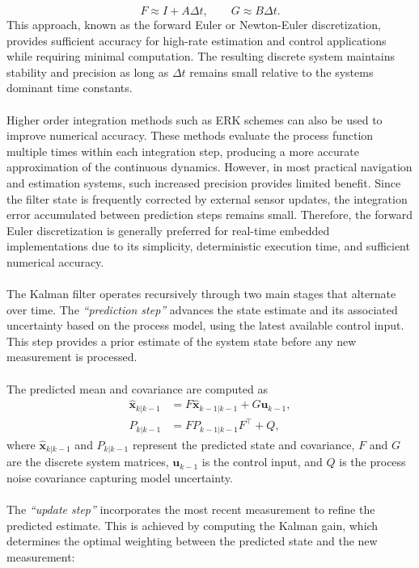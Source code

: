 $$
    F \approx I + A\Delta t, \qquad
    G \approx B\Delta t.
$$
This approach, known as the forward Euler or Newton-Euler discretization, provides sufficient accuracy for high-rate estimation and control applications while requiring minimal computation. The resulting discrete system maintains stability and precision as long as $\Delta t$ remains small relative to the systems dominant time constants.  
\\ \\
Higher order integration methods such as ERK schemes can also be used to improve numerical accuracy. These methods evaluate the process function multiple times within each integration step, producing a more accurate approximation of the continuous dynamics. However, in most practical navigation and estimation systems, such increased precision provides limited benefit. Since the filter state is frequently corrected by external sensor updates, the integration error accumulated between prediction steps remains small. Therefore, the forward Euler discretization is generally preferred for real-time embedded implementations due to its simplicity, deterministic execution time, and sufficient numerical accuracy.  
\\ \\
The Kalman filter operates recursively through two main stages that alternate over time. The \textit{``prediction step''} advances the state estimate and its associated uncertainty based on the process model, using the latest available control input. This step provides a prior estimate of the system state before any new measurement is processed.  
\\ \\
The predicted mean and covariance are computed as
$$
\begin{aligned}
    \hat{\mathbf{x}}_{k|k-1} &= F\hat{\mathbf{x}}_{k-1|k-1} + G\mathbf{u}_{k-1}, \\
    P_{k|k-1} &= FP_{k-1|k-1}F^\top + Q,
\end{aligned}
$$
where $\hat{\mathbf{x}}_{k|k-1}$ and $P_{k|k-1}$ represent the predicted state and covariance, $F$ and $G$ are the discrete system matrices, $\mathbf{u}_{k-1}$ is the control input, and $Q$ is the process noise covariance capturing model uncertainty.  
\\ \\
The \textit{``update step''} incorporates the most recent measurement to refine the predicted estimate. This is achieved by computing the Kalman gain, which determines the optimal weighting between the predicted state and the new measurement:
